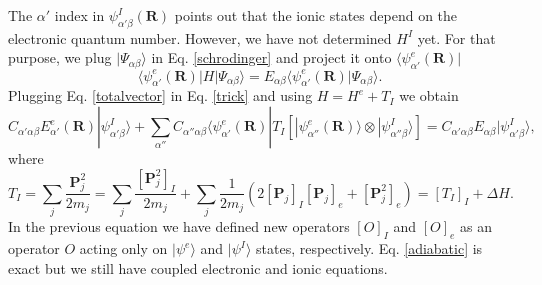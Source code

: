 The $\alpha'$ index in $\psi_{\alpha'\beta}^{I}(\mathbf{R})$ points out that the ionic states depend on the electronic quantum number. However, we have not determined $H^{I}$ yet. For that purpose, we plug 
$|\Psi_{\alpha\beta}\rangle$ in Eq. \ref{schrodinger} and project it onto $\langle\psi_{\alpha'}^{e}(\mathbf{R})|$
\begin{equation}
\label{trick}
 \langle\psi_{\alpha'}^{e}(\mathbf{R})|H|\Psi_{\alpha\beta}\rangle=E_{\alpha\beta}\langle\psi_{\alpha'}^{e}(\mathbf{R})|\Psi_{\alpha\beta}\rangle.
\end{equation}
Plugging Eq. \ref{totalvector} in Eq. \ref{trick} and using $H=H^{e}+T_{I}$ we obtain
\begin{equation}
\label{adiabatic}
 C_{\alpha'\alpha\beta}E_{\alpha'}^{e}(\mathbf{R})|\psi_{\alpha'\beta}^{I}\rangle+\sum_{\alpha''}C_{\alpha''\alpha\beta}\langle\psi_{\alpha'}^{e}(\mathbf{R})|T_{I}[|\psi_{\alpha''}^{e}(\mathbf{R})\rangle\otimes|\psi_{\alpha''\beta}^{
 I}\rangle]=C_{\alpha'\alpha\beta}E_{\alpha\beta}|\psi_{\alpha'\beta}^{I}\rangle,
\end{equation}
where
\begin{equation}
 T_{I}=\sum_{j}\frac{\mathbf{P}_{j}^{2}}{2m_{j}}=\sum_{j}\frac{[\mathbf{P}_{j}^{2}]_{I}}{2m_{j}}+\sum_{j}\frac{1}{2m_{j}}(2[\mathbf{P}_{j}]_{I}[\mathbf{P}_{j}]_{e}+[\mathbf{P}_{j}^{2}]_{e})=[T_{I}]_{I}+\Delta H.
\end{equation}
In the previous equation we have defined new operators $[O]_{I}$ and $[O]_{e}$ as an operator $O$ acting only on $|\psi^{e}\rangle$ and $|\psi^{I}\rangle$ states, respectively. Eq. \ref{adiabatic} is exact but we still 
have coupled electronic and ionic equations. \\

